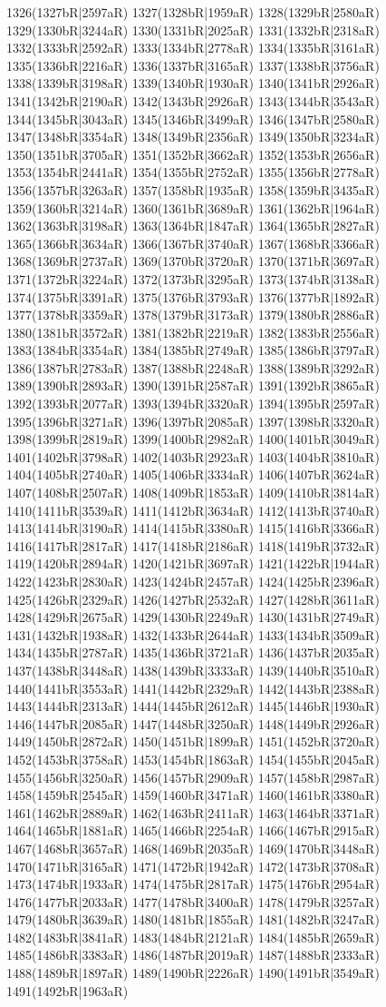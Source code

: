 1326(1327bR|2597aR) 1327(1328bR|1959aR) 1328(1329bR|2580aR) 1329(1330bR|3244aR) 1330(1331bR|2025aR) 1331(1332bR|2318aR) 1332(1333bR|2592aR) 1333(1334bR|2778aR) 1334(1335bR|3161aR) 1335(1336bR|2216aR) 1336(1337bR|3165aR) 1337(1338bR|3756aR) 1338(1339bR|3198aR) 1339(1340bR|1930aR) 1340(1341bR|2926aR) 1341(1342bR|2190aR) 1342(1343bR|2926aR) 1343(1344bR|3543aR) 1344(1345bR|3043aR) 1345(1346bR|3499aR) 1346(1347bR|2580aR) 1347(1348bR|3354aR) 1348(1349bR|2356aR) 1349(1350bR|3234aR) 1350(1351bR|3705aR) 1351(1352bR|3662aR) 1352(1353bR|2656aR) 1353(1354bR|2441aR) 1354(1355bR|2752aR) 1355(1356bR|2778aR) 1356(1357bR|3263aR) 1357(1358bR|1935aR) 1358(1359bR|3435aR) 1359(1360bR|3214aR) 1360(1361bR|3689aR) 1361(1362bR|1964aR) 1362(1363bR|3198aR) 1363(1364bR|1847aR) 1364(1365bR|2827aR) 1365(1366bR|3634aR) 1366(1367bR|3740aR) 1367(1368bR|3366aR) 1368(1369bR|2737aR) 1369(1370bR|3720aR) 1370(1371bR|3697aR) 1371(1372bR|3224aR) 1372(1373bR|3295aR) 1373(1374bR|3138aR) 1374(1375bR|3391aR) 1375(1376bR|3793aR) 1376(1377bR|1892aR) 1377(1378bR|3359aR) 1378(1379bR|3173aR) 1379(1380bR|2886aR) 1380(1381bR|3572aR) 1381(1382bR|2219aR) 1382(1383bR|2556aR) 1383(1384bR|3354aR) 1384(1385bR|2749aR) 1385(1386bR|3797aR) 1386(1387bR|2783aR) 1387(1388bR|2248aR) 1388(1389bR|3292aR) 1389(1390bR|2893aR) 1390(1391bR|2587aR) 1391(1392bR|3865aR) 1392(1393bR|2077aR) 1393(1394bR|3320aR) 1394(1395bR|2597aR) 1395(1396bR|3271aR) 1396(1397bR|2085aR) 1397(1398bR|3320aR) 1398(1399bR|2819aR) 1399(1400bR|2982aR) 1400(1401bR|3049aR) 1401(1402bR|3798aR) 1402(1403bR|2923aR) 1403(1404bR|3810aR) 1404(1405bR|2740aR) 1405(1406bR|3334aR) 1406(1407bR|3624aR) 1407(1408bR|2507aR) 1408(1409bR|1853aR) 1409(1410bR|3814aR) 1410(1411bR|3539aR) 1411(1412bR|3634aR) 1412(1413bR|3740aR) 1413(1414bR|3190aR) 1414(1415bR|3380aR) 1415(1416bR|3366aR) 1416(1417bR|2817aR) 1417(1418bR|2186aR) 1418(1419bR|3732aR) 1419(1420bR|2894aR) 1420(1421bR|3697aR) 1421(1422bR|1944aR) 1422(1423bR|2830aR) 1423(1424bR|2457aR) 1424(1425bR|2396aR) 1425(1426bR|2329aR) 1426(1427bR|2532aR) 1427(1428bR|3611aR) 1428(1429bR|2675aR) 1429(1430bR|2249aR) 1430(1431bR|2749aR) 1431(1432bR|1938aR) 1432(1433bR|2644aR) 1433(1434bR|3509aR) 1434(1435bR|2787aR) 1435(1436bR|3721aR) 1436(1437bR|2035aR) 1437(1438bR|3448aR) 1438(1439bR|3333aR) 1439(1440bR|3510aR) 1440(1441bR|3553aR) 1441(1442bR|2329aR) 1442(1443bR|2388aR) 1443(1444bR|2313aR) 1444(1445bR|2612aR) 1445(1446bR|1930aR) 1446(1447bR|2085aR) 1447(1448bR|3250aR) 1448(1449bR|2926aR) 1449(1450bR|2872aR) 1450(1451bR|1899aR) 1451(1452bR|3720aR) 1452(1453bR|3758aR) 1453(1454bR|1863aR) 1454(1455bR|2045aR) 1455(1456bR|3250aR) 1456(1457bR|2909aR) 1457(1458bR|2987aR) 1458(1459bR|2545aR) 1459(1460bR|3471aR) 1460(1461bR|3380aR) 1461(1462bR|2889aR) 1462(1463bR|2411aR) 1463(1464bR|3371aR) 1464(1465bR|1881aR) 1465(1466bR|2254aR) 1466(1467bR|2915aR) 1467(1468bR|3657aR) 1468(1469bR|2035aR) 1469(1470bR|3448aR) 1470(1471bR|3165aR) 1471(1472bR|1942aR) 1472(1473bR|3708aR) 1473(1474bR|1933aR) 1474(1475bR|2817aR) 1475(1476bR|2954aR) 1476(1477bR|2033aR) 1477(1478bR|3400aR) 1478(1479bR|3257aR) 1479(1480bR|3639aR) 1480(1481bR|1855aR) 1481(1482bR|3247aR) 1482(1483bR|3841aR) 1483(1484bR|2121aR) 1484(1485bR|2659aR) 1485(1486bR|3383aR) 1486(1487bR|2019aR) 1487(1488bR|2333aR) 1488(1489bR|1897aR) 1489(1490bR|2226aR) 1490(1491bR|3549aR) 1491(1492bR|1963aR) 